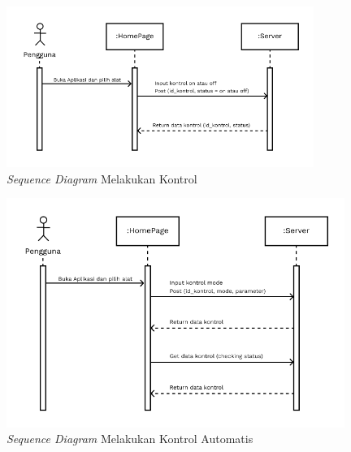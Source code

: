 \begin{flushleft}
\begin{justify}
\begin{enumerate}[label=\alph*.]
            \begin{figure}[ht]
                \centering
                \includegraphics[width=10cm]{images/bab 4/Sequence kontrol.png}
                \caption{\textit{Sequence Diagram} Melakukan Kontrol}
            \end{figure}
            \begin{figure}[ht]
                \centering
                \includegraphics[width=11cm]{images/bab 4/Sequence kontrol Auto.png}
                \caption{\textit{Sequence Diagram} Melakukan Kontrol Automatis}
            \end{figure}
            \end{enumerate}
            \vspace{10cm}

\end{justify}
\end{flushleft}
